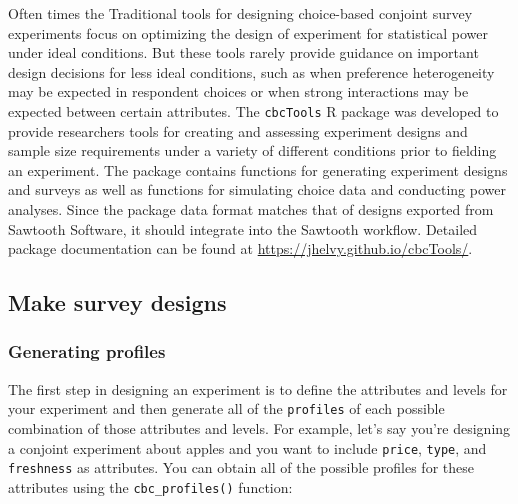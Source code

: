 \documentclass[
  12pt,
]{article}
\newenvironment{Shaded}{\begin{snugshade}}{\end{snugshade}}
\newcommand{\AttributeTok}[1]{\textcolor[rgb]{0.77,0.63,0.00}{#1}}
\newcommand{\CommentTok}[1]{\textcolor[rgb]{0.56,0.35,0.01}{\textit{#1}}}
\newcommand{\DecValTok}[1]{\textcolor[rgb]{0.00,0.00,0.81}{#1}}
\newcommand{\FloatTok}[1]{\textcolor[rgb]{0.00,0.00,0.81}{#1}}
\newcommand{\FunctionTok}[1]{\textcolor[rgb]{0.00,0.00,0.00}{#1}}
\newcommand{\NormalTok}[1]{#1}
\newcommand{\OtherTok}[1]{\textcolor[rgb]{0.56,0.35,0.01}{#1}}
\newcommand{\StringTok}[1]{\textcolor[rgb]{0.31,0.60,0.02}{#1}}
\begin{document}
Often times the Traditional tools for designing choice-based conjoint
survey experiments focus on optimizing the design of experiment for
statistical power under ideal conditions. But these tools rarely provide
guidance on important design decisions for less ideal conditions, such
as when preference heterogeneity may be expected in respondent choices
or when strong interactions may be expected between certain attributes.
The \texttt{cbcTools} R package was developed to provide researchers
tools for creating and assessing experiment designs and sample size
requirements under a variety of different conditions prior to fielding
an experiment. The package contains functions for generating experiment
designs and surveys as well as functions for simulating choice data and
conducting power analyses. Since the package data format matches that of
designs exported from Sawtooth Software, it should integrate into the
Sawtooth workflow. Detailed package documentation can be found at
\url{https://jhelvy.github.io/cbcTools/}.

\hypertarget{make-survey-designs}{%
\subsection{Make survey designs}\label{make-survey-designs}}

\hypertarget{generating-profiles}{%
\subsubsection{Generating profiles}\label{generating-profiles}}

The first step in designing an experiment is to define the attributes
and levels for your experiment and then generate all of the
\texttt{profiles} of each possible combination of those attributes and
levels. For example, let's say you're designing a conjoint experiment
about apples and you want to include \texttt{price}, \texttt{type}, and
\texttt{freshness} as attributes. You can obtain all of the possible
profiles for these attributes using the \texttt{cbc\_profiles()}
function:

\begin{Shaded}
\end{Shaded}
\end{document}
